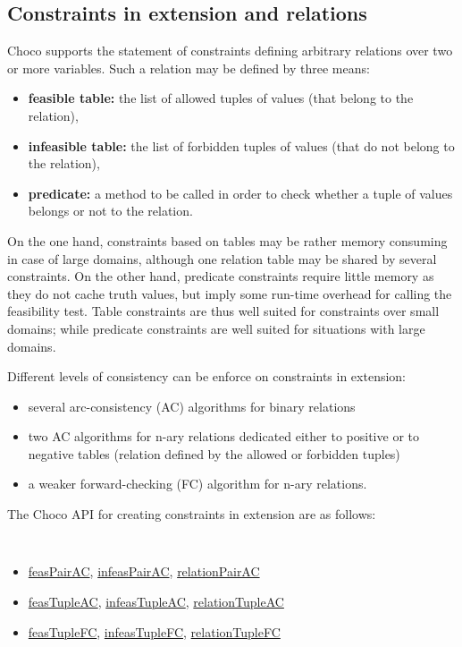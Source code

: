 \subsection{Constraints in extension and relations}\label{model:arbitraryconstraintsinextension}\hypertarget{model:arbitraryconstraintsinextension}{}
Choco supports the statement of constraints defining arbitrary relations over two or more variables.
Such a relation may be defined by three means:
\begin{itemize}
	\item \textbf{feasible table:} the list of allowed tuples of values (that belong to the relation),
	\item \textbf{infeasible table:} the list of forbidden tuples of values (that do not belong to the relation),
	\item \textbf{predicate:} a method to be called in order to check whether a tuple of values belongs or not to the relation.
\end{itemize}
On the one hand, constraints based on tables may be rather memory consuming in case of large domains, although one relation table may be shared by several constraints. On the other hand, predicate constraints require little memory as they do not cache truth values, but imply some run-time overhead for calling the feasibility test. Table constraints are thus well suited for constraints over small domains; while predicate constraints are well suited for situations with large domains. 

Different levels of consistency can be enforce on constraints in extension: 
\begin{itemize}
\item several arc-consistency (AC) algorithms for binary relations
\item two AC algorithms for n-ary relations dedicated either to positive or to negative tables (relation defined by the allowed or forbidden tuples)
\item a weaker forward-checking (FC) algorithm for n-ary relations.
\end{itemize}

The Choco API for creating constraints in extension are as follows:
\begin{notedef}\tt
  \begin{itemize}
  \item \hyperlink{feaspairac:feaspairacconstraint}{feasPairAC}, \hyperlink{infeaspairac:infeaspairacconstraint}{infeasPairAC}, \hyperlink{relationpairac:relationpairacconstraint}{relationPairAC}
  \item \hyperlink{feastupleac:feastupleacconstraint}{feasTupleAC}, \hyperlink{infeastupleac:infeastupleacconstraint}{infeasTupleAC}, \hyperlink{relationtupleac:relationtupleacconstraint}{relationTupleAC}
  \item \hyperlink{feastuplefc:feastuplefcconstraint}{feasTupleFC}, \hyperlink{infeastuplefc:infeastuplefcconstraint}{infeasTupleFC}, \hyperlink{relationtuplefc:relationtuplefcconstraint}{relationTupleFC}
  \end{itemize}
\end{notedef}

